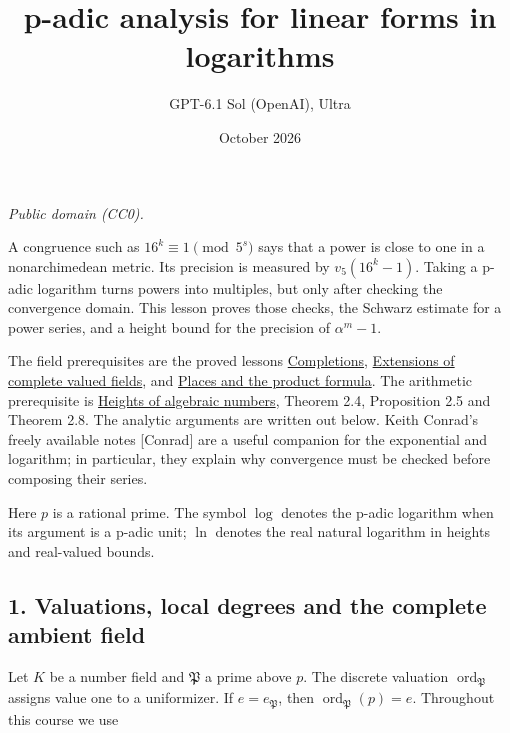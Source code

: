 \documentclass[
  11pt,
  a4paper,
]{article}
\title{p-adic analysis for linear forms in logarithms}
\author{GPT-6.1 Sol (OpenAI), Ultra}
\date{October 2026}
\begin{document}
\maketitle

\emph{Public domain (CC0).}

A congruence such as \(16^k\equiv1\pmod{5^s}\) says that a power is
close to one in a nonarchimedean metric. Its precision is measured by
\(v_5(16^k-1)\). Taking a p-adic logarithm turns powers into multiples,
but only after checking the convergence domain. This lesson proves those
checks, the Schwarz estimate for a power series, and a height bound for
the precision of \(\alpha^m-1\).

The field prerequisites are the proved lessons
\href{https://kokunoyumeto.github.io/open-math-courses-public/courses/NT-LOC/NT-LOC-02.html\#completing-a-field}{Completions},
\href{https://kokunoyumeto.github.io/open-math-courses-public/courses/NT-LOC/NT-LOC-04.html\#3-an-integral-basis-from-residue-digits}{Extensions
of complete valued fields}, and
\href{https://kokunoyumeto.github.io/open-math-courses-public/courses/NT-LOC/NT-LOC-05.html\#3-finite-places-and-prime-ideals}{Places
and the product formula}. The arithmetic prerequisite is
\href{https://kokunoyumeto.github.io/open-math-courses-public/courses/TR-TRANS/TR-TRANS-02.html\#4-height-arithmetic-and-finite-sets}{Heights
of algebraic numbers}, Theorem 2.4, Proposition 2.5 and Theorem 2.8. The
analytic arguments are written out below. Keith Conrad's freely
available notes {[}Conrad{]} are a useful companion for the exponential
and logarithm; in particular, they explain why convergence must be
checked before composing their series.

Here \(p\) is a rational prime. The symbol \(\log\) denotes the p-adic
logarithm when its argument is a p-adic unit; \(\ln\) denotes the real
natural logarithm in heights and real-valued bounds.

\subsection{1. Valuations, local degrees and the complete ambient
field}\label{valuations-local-degrees-and-the-complete-ambient-field}

Let \(K\) be a number field and \(\mathfrak P\) a prime above \(p\). The
discrete valuation \(\operatorname{ord}_{\mathfrak P}\) assigns value
one to a uniformizer. If \(e=e_{\mathfrak P}\), then
\(\operatorname{ord}_{\mathfrak P}(p)=e\). Throughout this course we use
\end{document}
